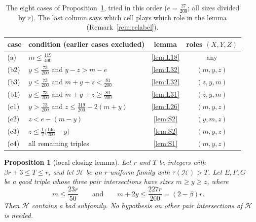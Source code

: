 \documentclass[11pt]{amsart}
\newtheorem{proposition}[theorem]{Proposition}
\theoremstyle{definition}
\theoremstyle{remark}
\newcommand{\cH}{\mathcal H}
\begin{document}
\begin{table}[htb]
\centering\small
\renewcommand{\arraystretch}{1.3}
\begin{tabular}{llcc}
\hline
case & condition (earlier cases excluded) & lemma & roles $(X,Y,Z)$\\
\hline
(a) & $m\le\frac{119}{400}$ & \ref{lem:L18} & any\\
(b2) & $y\le\frac{73}{200}$ and $y-z>m-e$ & \ref{lem:L32} & $(m,y,z)$\\
(b3) & $y\le\frac{73}{200}$ and $m+y+z<\frac{81}{200}$ & \ref{lem:L32} & $(z,y,m)$\\
(b1) & $y\le\frac{73}{200}$ and $m+y+z\ge\frac{81}{200}$ & \ref{lem:L31} & $(z,y,m)$\\
(c1) & $y>\frac{73}{200}$ and $z\le\frac{319}{200}-2(m+y)$ & \ref{lem:L26} & $(m,y,z)$\\
(c2) & $z<e-(m-y)$ & \ref{lem:S2} & $(y,m,z)$\\
(c3) & $z\le\frac12\bigl(\frac{146}{200}-y\bigr)$ & \ref{lem:S2} & $(m,y,z)$\\
(c4) & all remaining triples & \ref{lem:S1} & $(m,y,z)$\\
\hline
\end{tabular}
\caption{The eight cases of Proposition~\ref{prop:local}, tried in this order ($e=\frac{27}{200}$; all sizes divided by $r$). The last column says which cell plays which role in the lemma (Remark~\ref{rem:relabel}).}\label{tab:cases}
\end{table}

\begin{proposition}[local closing lemma]\label{prop:local}
Let $r$ and $T$ be integers with $\beta r+3\le T\le r$, and let $\cH$ be an $r$-uniform family with $\tau(\cH)>T$. Let $E,F,G$ be a good triple whose three pair intersections have sizes $m\ge y\ge z$, where
\[
m\le\frac{23r}{50}\qquad\text{and}\qquad m+2y\le\frac{227r}{200}=(2-\beta)r .
\]
Then $\cH$ contains a bad subfamily. No hypothesis on other pair intersections of $\cH$ is needed.
\end{proposition}
\end{document}
